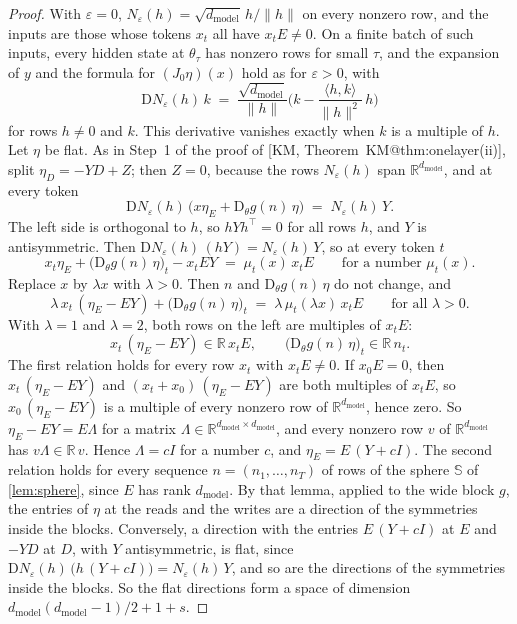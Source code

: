 \documentclass[10pt]{article}
\makeatletter
\theoremstyle{definition}
\theoremstyle{remark}
\newcommand{\R}{\mathbb{R}}
\newcommand{\dm}{d_{\mathrm{model}}}
\newcommand{\Der}{\mathrm{D}}
\newcommand{\norm}[1]{\lVert #1\rVert}
\newcommand{\KMn}[1]{\csname KM@#1\endcsname}
\newcommand{\KMp}[3]{[KM, #1~\KMn{#2}(#3)]}
\makeatother
\begin{document}
\begin{proof}
With $\varepsilon = 0$, $N_\varepsilon(h) = \sqrt{\dm}\,h/\norm{h}$ on every nonzero row, and the inputs are those whose tokens $x_t$ all have $x_tE \neq 0$. On a finite batch of such inputs, every hidden state at $\theta_\tau$ has nonzero rows for small $\tau$, and the expansion of $y$ and the formula for $(J_0\eta)(x)$ hold as for $\varepsilon > 0$, with
\[
\Der N_\varepsilon(h)\,k \;=\; \frac{\sqrt{\dm}}{\norm{h}}\Big(k - \frac{\langle h, k\rangle}{\norm{h}^2}\,h\Big)
\]
for rows $h \neq 0$ and $k$. This derivative vanishes exactly when $k$ is a multiple of $h$. Let $\eta$ be flat. As in Step~1 of the proof of \KMp{Theorem}{thm:onelayer}{ii}, split $\eta_D = -YD + Z$; then $Z = 0$, because the rows $N_\varepsilon(h)$ span $\R^{\dm}$, and at every token
\[
\Der N_\varepsilon(h)\,\big(x\eta_E + \Der_\theta g(n)\,\eta\big) \;=\; N_\varepsilon(h)\,Y .
\]
The left side is orthogonal to $h$, so $hYh^\top = 0$ for all rows $h$, and $Y$ is antisymmetric. Then $\Der N_\varepsilon(h)\,(hY) = N_\varepsilon(h)\,Y$, so at every token $t$
\[
x_t\eta_E + \big(\Der_\theta g(n)\,\eta\big)_t - x_tEY \;=\; \mu_t(x)\,x_tE \qquad\text{for a number } \mu_t(x).
\]
Replace $x$ by $\lambda x$ with $\lambda > 0$. Then $n$ and $\Der_\theta g(n)\,\eta$ do not change, and
\[
\lambda\,x_t\,(\eta_E - EY) + \big(\Der_\theta g(n)\,\eta\big)_t \;=\; \lambda\,\mu_t(\lambda x)\,x_tE \qquad\text{for all } \lambda > 0 .
\]
With $\lambda = 1$ and $\lambda = 2$, both rows on the left are multiples of $x_tE$:
\[
x_t\,(\eta_E - EY) \in \R\,x_tE, \qquad \big(\Der_\theta g(n)\,\eta\big)_t \in \R\,n_t .
\]
The first relation holds for every row $x_t$ with $x_tE \neq 0$. If $x_0E = 0$, then $x_t\,(\eta_E - EY)$ and $(x_t + x_0)\,(\eta_E - EY)$ are both multiples of $x_tE$, so $x_0\,(\eta_E - EY)$ is a multiple of every nonzero row of $\R^{\dm}$, hence zero. So $\eta_E - EY = E\Lambda$ for a matrix $\Lambda \in \R^{\dm\times\dm}$, and every nonzero row $v$ of $\R^{\dm}$ has $v\Lambda \in \R\,v$. Hence $\Lambda = cI$ for a number $c$, and $\eta_E = E\,(Y + cI)$. The second relation holds for every sequence $n = (n_1, \dots, n_T)$ of rows of the sphere $\mathbb S$ of \cref{lem:sphere}, since $E$ has rank $\dm$. By that lemma, applied to the wide block $g$, the entries of $\eta$ at the reads and the writes are a direction of the symmetries inside the blocks. Conversely, a direction with the entries $E\,(Y + cI)$ at $E$ and $-YD$ at $D$, with $Y$ antisymmetric, is flat, since $\Der N_\varepsilon(h)\,\big(h\,(Y + cI)\big) = N_\varepsilon(h)\,Y$, and so are the directions of the symmetries inside the blocks. So the flat directions form a space of dimension $\dm(\dm-1)/2 + 1 + s$.


\end{proof}
\end{document}
